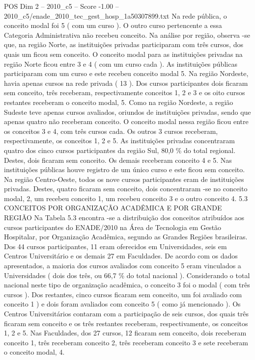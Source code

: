 \begin{textsample}{POS Dim 2 – 2010\_c5 – Score -1.00 – 2010\_c5/enade\_2010\_tec\_gest\_hosp\_1a50307899.txt}
Na rede pública, o conceito modal foi 5 ( com um curso ).
O outro curso pertencente a essa Categoria Administrativa não recebeu conceito.
Na análise por região, observa -se que, na região Norte, as instituições privadas participaram com três cursos, dos quais um ficou sem conceito.
O conceito modal para as instituições privadas na região Norte ficou entre 3 e 4 ( com um curso cada ).
As instituições públicas participaram com um curso e este recebeu conceito modal 5.
Na região Nordeste, havia apenas cursos na rede privada ( 13 ).
Dos cursos participantes dois ficaram sem conceito, três receberam, respectivamente conceitos 1, 2 e 3 e os oito cursos restantes receberam o conceito modal, 5.
Como na região Nordeste, a região Sudeste teve apenas cursos avaliados, oriundos de instituições privadas, sendo que apenas quatro não receberam conceito.
O conceito modal nessa região ficou entre os conceitos 3 e 4, com três cursos cada.
Os outros 3 cursos receberam, respectivamente, os conceitos 1, 2 e 5.
As instituições privadas concentraram quatro dos cinco cursos participantes da região Sul, 80,0 \% do total regional.
Destes, dois ficaram sem conceito.
Os demais receberam conceito 4 e 5.
Nas instituições públicas houve registro de um único curso e este ficou sem conceito.
Na região Centro-Oeste, todos os nove cursos participantes eram de instituições privadas.
Destes, quatro ficaram sem conceito, dois concentraram -se no conceito modal, 2, um recebeu conceito 1, um recebeu conceito 3 e o outro conceito 4. 5.3 CONCEITOS POR ORGANIZAÇÃO ACADÊMICA E POR GRANDE REGIÃO Na Tabela 5.3 encontra -se a distribuição dos conceitos atribuídos aos cursos participantes do ENADE/2010 na Área de Tecnologia em Gestão Hospitalar, por Organização Acadêmica, segundo as Grandes Regiões brasileiras.
Dos 44 cursos participantes, 11 eram oferecidos em Universidades, seis em Centros Universitário e os demais 27 em Faculdades.
De acordo com os dados apresentados, a maioria dos cursos avaliados com conceito 5 eram vinculados a Universidades ( dois dos três, ou 66,7 \% do total nacional ).
Considerando o total nacional neste tipo de organização acadêmica, o conceito 3 foi o modal ( com três cursos ).
Dos restantes, cinco cursos ficaram sem conceito, um foi avaliado com conceito 1 ) e dois foram avaliados com conceito 5 ( como já mencionado ).
Os Centros Universitários contaram com a participação de seis cursos, dos quais três ficaram sem conceito e os três restantes receberam, respectivamente, os conceitos 1, 2 e 5.
Nas Faculdades, dos 27 cursos, 12 ficaram sem conceito, dois receberam conceito 1, três receberam conceito 2, três receberam conceito 3 e sete receberam o conceito modal, 4.

\end{textsample}
